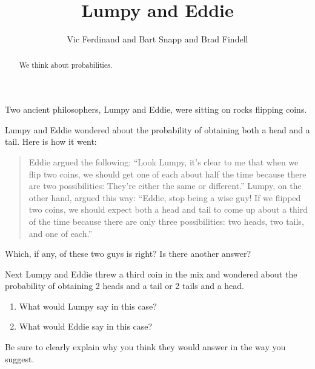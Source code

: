 \documentclass[nooutcomes]{ximera}
\title{Lumpy and Eddie}
\author{Vic Ferdinand and Bart Snapp and Brad Findell}
\begin{document}
\begin{abstract}
  We think about probabilities.
\end{abstract}
\maketitle

Two ancient philosophers, Lumpy and Eddie, were sitting on rocks
flipping coins. 

\begin{problem} Lumpy and Eddie wondered about the probability of obtaining both a head and a tail. Here is how it went:
\begin{quote}
Eddie argued the following: ``Look Lumpy, it's clear to me that when
we flip two coins, we should get one of each about half the time
because there are two possibilities: They're either the same or
different.'' Lumpy, on the other hand, argued this way: ``Eddie, stop
being a wise guy! If we flipped two coins, we should expect both a
head and tail to come up about a third of the time because there are
only three possibilities: two heads, two tails, and one of each.''
\end{quote}
Which, if any, of these two guys is right?  Is there another answer?
\end{problem}

\begin{problem}
Next Lumpy and Eddie threw a third coin in the mix and wondered about
the probability of obtaining 2 heads and a tail or 2 tails and a head.
\begin{enumerate}
\item What would Lumpy say in this case?
\item What would Eddie say in this case?
\end{enumerate}
Be sure to clearly explain why you think they would answer in the way
you suggest.
\end{problem}
\end{document}
